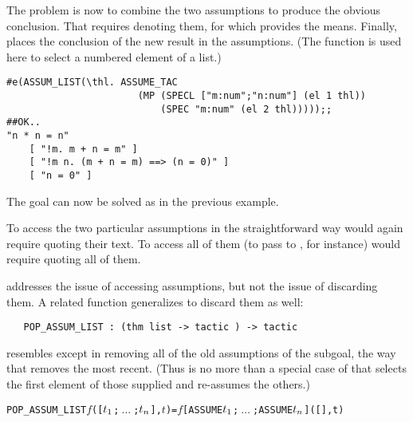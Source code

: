 \noindent The problem is now to combine the two assumptions to produce the
obvious conclusion. That requires denoting
%
%
them, for which 
provides the means. Finally,
 places the conclusion of the new result in the assumptions.
(The \ML{} function  is used here to select a
numbered element of a list.)

\begin{session}\begin{verbatim}
#e(ASSUM_LIST(\thl. ASSUME_TAC
                       (MP (SPECL ["m:num";"n:num"] (el 1 thl))
                           (SPEC "m:num" (el 2 thl)))));;
##OK..
"n * n = n"
    [ "!m. m + n = m" ]
    [ "!m n. (m + n = m) ==> (n = 0)" ]
    [ "n = 0" ]
\end{verbatim}\end{session}

\noindent The goal can now be solved as in the previous example.

To access the
two particular assumptions in the straightforward way would again require quoting
their text. To access all of them (to pass to , for
instance) would require quoting all of them.

 addresses the issue of accessing assumptions,
but not the issue of discarding them.  A related function generalizes
 to discard them as well:

\begin{hol}\begin{verbatim}
   POP_ASSUM_LIST : (thm list -> tactic ) -> tactic
\end{verbatim}\end{hol}

\noindent {}
resembles  except in removing
all of the old assumptions of the subgoal, the way that 
removes the most recent.  (Thus  is no more than a special case
of  that selects the first element of those supplied
and re-assumes the others.)

\begin{hol}\begin{alltt}
   POP_ASSUM_LIST \(f\) ([\(t\sb{1}\);\(\ \ldots\ \);\(t\sb{n}\)],\(t\)) = \(f\) [ASSUME \(t\sb{1}\);\(\ \ldots\ \);ASSUME \(t\sb{n}\)] ([],t)
\end{alltt}\end{hol}

